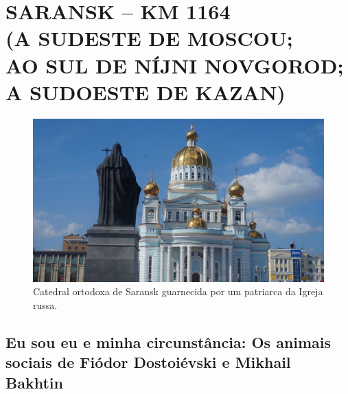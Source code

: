 \clearpage
\thispagestyle{empty}



\makeatletter\@openrightfalse
\movetooddpage
\part*{SARANSK -- KM 1164\\(A SUDESTE DE MOSCOU;\\AO SUL DE NÍJNI NOVGOROD;\\A SUDOESTE DE KAZAN)}

\movetoevenpage
\begin{absolutelynopagebreak}
\begin{vplace}
\begin{figure}[H]
\begin{adjustwidth}{-1.8cm}{}
  \vspace{2.7cm}
  \includegraphics[width=130mm]{./imgs/saransk1.jpg}  
\end{adjustwidth}
  \caption{Catedral ortodoxa de Saransk guarnecida por um patriarca da Igreja russa.}

\thispagestyle{empty}

\end{figure}
\end{vplace}

\end{absolutelynopagebreak}

\chapter*{Eu sou eu e minha circunstância: Os animais sociais de Fiódor Dostoiévski e Mikhail Bakhtin}
\@openrighttrue\makeatother

